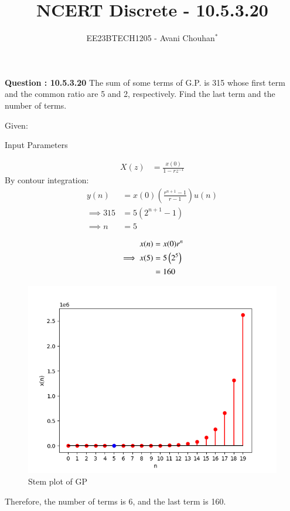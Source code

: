 \documentclass[journal,12pt,twocolumn]{IEEEtran}
\theoremstyle{remark}
\begin{document}

\vspace{3cm}

\title{NCERT Discrete - 10.5.3.20}
\author{EE23BTECH1205 - Avani Chouhan$^{*}$%
}
\maketitle
\newpage
\bigskip

\renewcommand{\thefigure}{\theenumi}
\renewcommand{\thetable}{\theenumi}

\vspace{3cm}
\textbf{Question : 10.5.3.20} 
The sum of some terms of G.P. is 315 whose first term and the common ratio are 5 and 2, respectively. Find the last term and the number of terms.\\
\solution

Given:
\begin{table}
  \centering
  
  
  \caption{Input Parameters}
  \label{tab:10.5.3.20table1}
\end{table}
\begin{align}
X(z) &= \frac{x(0)}{1-rz^{-1}}
\end{align}
By contour integration:
\begin{align}
y(n) &= x(0)\left(\frac{r^{n+1}-1}{r-1}\right)u(n)\\
\implies 315 &= 5(2^{n+1}- 1)  \\
\implies n &= 5
\end{align}

\begin{align}
x(n) &= x(0)r^{n}\\
\implies x(5) &= 5\left(2^{5}\right)\\
 &= 160 
\end{align}

\begin{figure}
    \centering
    \includegraphics[width=0.8\columnwidth]{figs/graph.png}
    \caption{Stem plot of GP}
    \label{fig:10.5.3.20fig1}
\end{figure}

Therefore, the number of terms is 6, and the last term is 160.
\end{document}
